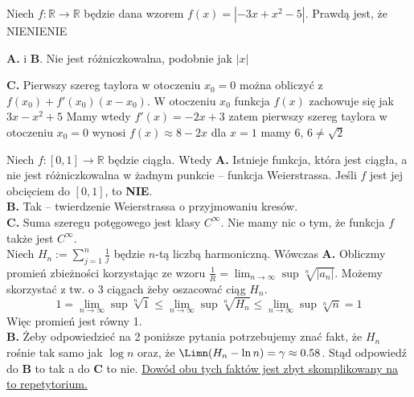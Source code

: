 \begin{solutions}
    \sol Niech $f: \mathbb{R} \to \mathbb{R}$ będzie dana wzorem $f(x) = \left|-3x+x^2-5\right|$. Prawdą jest, że
    {NIE}{NIE}{NIE}
    
    \textbf{A.} i \textbf{B}. Nie jest różniczkowalna, podobnie jak $|x|$

    \textbf{}
    
    \textbf{C.} Pierwszy szereg taylora w otoczeniu $x_0 = 0$ można obliczyć z $f(x_0) + f'(x_0)(x-x_0)$. W otoczeniu $x_0$ funkcja $f(x)$ zachowuje się jak $3x-x^2 + 5$ Mamy wtedy $f'(x) = -2x +3$ zatem pierwszy szereg taylora w otoczeniu $x_0 = 0$ wynosi $f(x) \approx 8 - 2x$ dla $x = 1$ mamy $6$, $6 \neq \sqrt{2}$ 
    
    \sol Niech $f: [0, 1] \to \mathbb{R}$ będzie ciągła. Wtedy
    \textbf{A.} Istnieje funkcja, która jest ciągła, a nie jest różniczkowalna w żadnym punkcie -- funkcja Weierstrassa. Jeśli $f$ jest jej obcięciem do $[0,1]$, to \textbf{NIE}. \\
    \textbf{B.} Tak -- twierdzenie Weierstrassa o przyjmowaniu kresów. \\
    \textbf{C.} Suma szeregu potęgowego jest klasy $C^{\infty}$. Nie mamy nic o tym, że funkcja $f$ także jest $C^{\infty}$. \\

    \sol Niech $H_n := \sum_{j=1}^n \frac{1}{j}$ będzie $n$-tą liczbą harmoniczną. Wówczas
    \textbf{A.} Obliczmy promień zbieżności korzystając ze wzoru $\frac{1}{R} = \lim_{n \to \infty} \sup \sqrt[n]{|a_n|}$. Możemy skorzystać z tw. o 3 ciągach żeby oszacować ciąg $H_n$.
    $$
    1 = \lim_{n \to \infty} \sup \sqrt[n]{1} \leq \lim_{n \to \infty} \sup \sqrt[n]{H_n} 
    \leq \lim_{n \to \infty} \sup \sqrt[n]{n} = 1
    $$
    Więc promień jest równy 1.\\
    \textbf{B.} Żeby odpowiedzieć na 2 poniższe pytania potrzebujemy znać fakt, że $H_n$ rośnie tak samo jak $\log{n}$ oraz, że $\Limn (H_n - \ln n) = \gamma \approx 0.58$. Stąd odpowiedź do \textbf{B} to tak a do \textbf{C} to nie. \href{https://en.wikipedia.org/wiki/Harmonic_series_%28mathematics%29#Partial_sums}{Dowód obu tych faktów jest zbyt skomplikowany na to repetytorium.}
    

\end{solutions}
